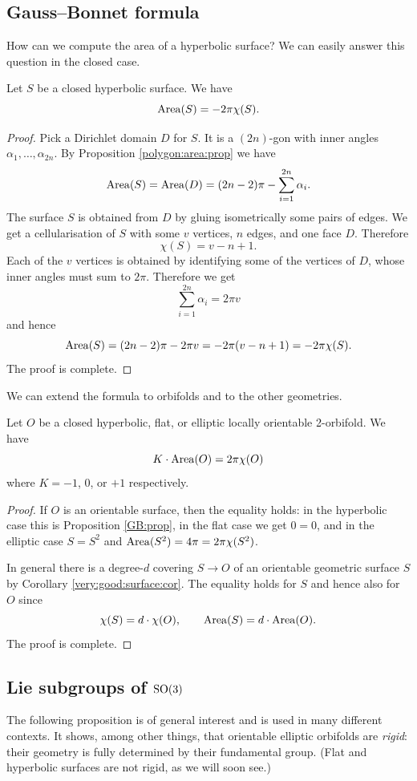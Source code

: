 \subsection{Gauss--Bonnet formula}
How can we compute the area of a hyperbolic surface? We can easily answer this question in the closed case. 

\begin{prop} \label{GB:prop}
Let $S$ be a closed hyperbolic surface. We have
$${\rm Area} (S) = -2\pi \chi(S).$$
\end{prop}
\begin{proof}
Pick a Dirichlet domain $D$ for $S$. It is a $(2n)$-gon with inner angles $\alpha_1, \ldots, \alpha_{2n}$. By Proposition \ref{polygon:area:prop} we have
$${\rm Area}(S) = {\rm Area}(D) = (2n-2)\pi - \sum_{i=1}^{2n} \alpha_i.$$
The surface $S$ is obtained from $D$ by gluing isometrically some pairs of edges. We get a cellularisation of $S$ with some $v$ vertices, $n$ edges, and one face $D$. Therefore 
$$\chi(S) = v - n + 1.$$
Each of the $v$ vertices is obtained by identifying some of the vertices of $D$, whose inner angles must sum to $2 \pi$. Therefore we get
$$\sum_{i=1}^{2n} \alpha_i = 2\pi v$$
and hence 
$${\rm Area}(S) = (2n-2)\pi - 2\pi v = -2\pi(v-n+1) = -2\pi \chi(S).$$
The proof is complete.
\end{proof}
We can extend the formula to orbifolds and to the other geometries. 
\begin{cor}
Let $O$ be a closed hyperbolic, flat, or elliptic locally orientable 2-orbifold. We have
$$K\cdot{\rm Area}(O) = 2\pi \chi(O)$$
where $K=-1$, $0$, or $+1$ respectively.
\end{cor}
\begin{proof}
If $O$ is an orientable surface, then the equality holds: in the hyperbolic case this is Proposition \ref{GB:prop}, in the flat case we get $0=0$, and in the elliptic case $S=S^2$ and ${\rm Area}(S^2) = 4\pi = 2\pi \chi(S^2)$.

In general there is a degree-$d$ covering $S\to O$ of an orientable geometric surface $S$ by Corollary \ref{very:good:surface:cor}. The equality holds for $S$ and hence also for $O$ since 
$$\chi(S) = d \cdot \chi(O), \qquad {\rm Area} (S) = d \cdot {\rm Area} (O).$$
The proof is complete.
\end{proof}

\subsection{Lie subgroups of ${\rm SO}(3)$}
The following proposition is of general interest and is used in many different contexts.
It shows, among other things, that orientable elliptic orbifolds are \emph{rigid}: their geometry is fully determined by their fundamental group. (Flat and hyperbolic surfaces are not rigid, as we will soon see.)

